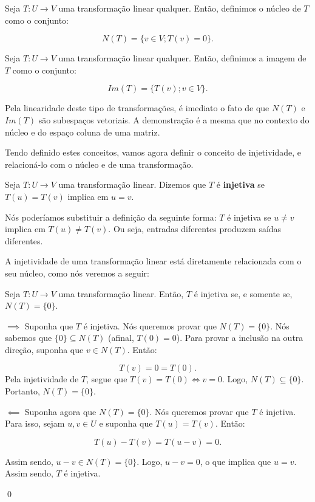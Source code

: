 \begin{Definition}
	Seja $T:U\to V$ uma transformação linear qualquer. Então, definimos o núcleo de $T$ como o conjunto:
	
	$$
	N(T) = \{v\in V; T(v) = 0\}.
	$$
\end{Definition}

\begin{Definition}
	Seja $T:U\to V$ uma transformação linear qualquer. Então, definimos a imagem de $T$ como o conjunto:
	
	$$
	Im(T) = \{T(v); v\in V\}.
	$$
\end{Definition}

Pela linearidade deste tipo de transformações, é imediato o fato de que $N(T)$ e $Im(T)$ são subespaços vetoriais. A demonstração é a mesma que no contexto do núcleo e do espaço coluna de uma matriz.

Tendo definido estes conceitos, vamos agora definir o conceito de injetividade, e relacioná-lo com o núcleo e de uma transformação.

\begin{Definition}[Injetividade]
	Seja $T:U\to V$ uma transformação linear. Dizemos que $T$ é \textbf{injetiva} se $T(u) = T(v)$ implica em $u = v$.
\end{Definition}

Nós poderíamos substituir a definição da seguinte forma: $T$ é injetiva se $u\neq v$ implica em $T(u)\neq T(v)$. Ou seja, entradas diferentes produzem saídas diferentes.

A injetividade de uma transformação linear está diretamente relacionada com o seu núcleo, como nós veremos a seguir:

\begin{Proposition}
	Seja $T:U\to V$ uma transformação linear. Então, $T$ é injetiva se, e somente se, $N(T) = \{0\}$.
\end{Proposition}

\begin{Proof}
	$\implies$ Suponha que $T$ é injetiva. Nós queremos provar que $N(T) = \{0\}$. Nós sabemos que $\{0\}\subseteq N(T)$ (afinal, $T(0) = 0$). Para provar a inclusão na outra direção, suponha que $v\in N(T)$. Então:
	
	$$
	T(v) = 0 = T(0).
	$$
	Pela injetividade de $T$, segue que $T(v) = T(0)\iff v = 0$. Logo, $N(T)\subseteq\{0\}$. Portanto, $N(T) = \{0\}$.
	
	$\impliedby$ Suponha agora que $N(T) = \{0\}$. Nós queremos provar que $T$ é injetiva. Para isso, sejam $u, v\in U$ e suponha que $T(u) = T(v)$. Então:
	
	$$
	T(u) - T(v) = T(u - v) = 0.
	$$
	
	Assim sendo, $u - v\in N(T) = \{0\}$. Logo, $u - v = 0$, o que implica que $u = v$. Assim sendo, $T$ é injetiva.
	
	\qed
\end{Proof}


